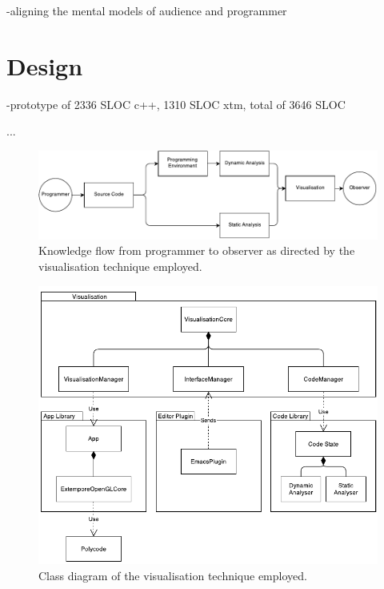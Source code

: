 -aligning the mental models of audience and programmer

\more

\section{Design}

-prototype of 2336 SLOC c++, 1310 SLOC xtm, total of 3646 SLOC

\cite{Purchase1996}...

\begin{figure}
  \centering \includegraphics[width=\columnwidth]{../images/diagrams/knowledge-flow-refined.pdf}
  \caption{Knowledge flow from programmer to observer as directed by the visualisation technique employed.}
\label{fig:knowledge-flow-refined}
\end{figure}

\begin{figure}
  \centering \includegraphics[width=\columnwidth]{../images/diagrams/visualisation-class-diagram.pdf}
  \caption{Class diagram of the visualisation technique employed.}
\label{fig:visualisation-class-diagram}
\end{figure}


